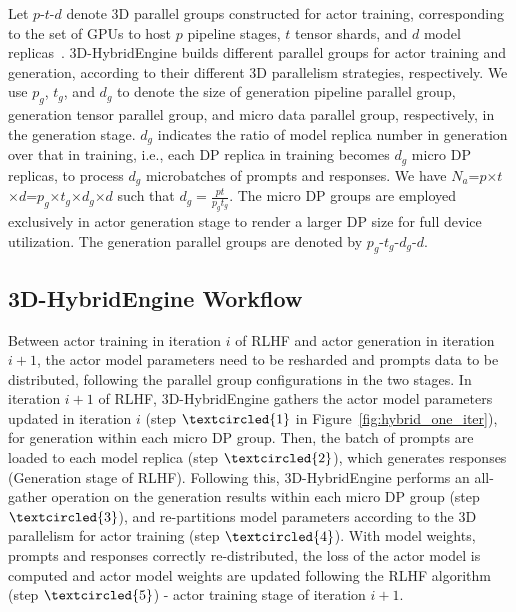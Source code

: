 Let $p$-$t$-$d$ denote 3D parallel groups constructed for %
actor training, corresponding to the set of GPUs to host $p$ pipeline stages, $t$ tensor shards, and $d$ model replicas~\cite{narayanan2021efficient}. 3D-HybridEngine builds different parallel groups for actor training and generation, according to their different 3D parallelism strategies, respectively. We use $p_g$, $t_g$, and $d_g$ to denote the size of generation pipeline parallel group, generation tensor parallel group, and micro data parallel group, respectively, 
in the generation stage.  
$d_{g}$ indicates the ratio %
of model replica number in generation over that in training, i.e., each DP replica in training becomes $d_{g}$ micro DP replicas, to process $d_{g}$ microbatches of prompts and responses. We have $N_a$=$p$$\times$$t$$\times$$d$=$p_g$$\times$$t_g$$\times$$d_g$$\times$$d$ such that $d_{g} = \frac{pt}{p_{g}t_{g}}$. %
The micro DP groups are employed exclusively in actor generation stage to render a larger DP size for full device utilization.
The generation parallel groups are denoted by $p_g$-$t_g$-$d_g$-$d$. %


\subsection{3D-HybridEngine Workflow}
Between actor training in iteration $i$ of RLHF and actor generation in iteration $i+1$, the actor model parameters need to be resharded and prompts data to be distributed,
following the parallel group configurations in the two stages.
In iteration $i+1$ of RLHF, %
3D-HybridEngine gathers the actor model parameters updated in iteration $i$ (step $\textcircled{1}$ in Figure~\ref{fig:hybrid_one_iter}), for generation within each micro DP group. Then, the batch of prompts are loaded to each model replica (step $\textcircled{2}$), which generates responses (Generation stage of RLHF). 
Following this, 3D-HybridEngine performs an all-gather operation on the generation results within each micro DP group (step $\textcircled{3}$), and re-partitions %
model parameters according to the 3D parallelism for actor training %
(step $\textcircled{4}$). 
With model weights, prompts and responses correctly re-distributed, %
the loss of the actor model is computed and actor model weights are updated following the RLHF algorithm %
(step $\textcircled{5}$) - actor training stage of iteration $i+1$.


















